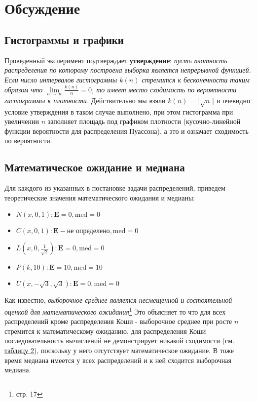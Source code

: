 \documentclass[12pt,a4paper]{article}
\begin{document}
\section{Обсуждение}
\subsection{Гистограммы и графики}
Проведенный эксперимент подтверждает \textbf{утверждение}: \textit{пусть плотность распределения по которому построена выборка является непрерывной функцией. Если число интервалов гистограммы $k(n)$ стремится к бесконечности таким образом что $\lim\limits_{n\to\infty}{\frac{k(n)}{n}}=0$, то имеет место сходимость по вероятности гистограммы к плотности.}\cite{chernova} Действительно мы взяли $k(n)=\lceil\sqrt{n}\rceil$ и очевидно условие утверждения в таком случае выполнено, при этом гистограмма при увеличении $n$ заполняет площадь под графиком плотности (кусочно-линейной функции вероятности для распределения Пуассона), а это и означает сходимость по вероятности.

\subsection{Математическое ожидание и медиана}
Для каждого из указанных в постановке задачи распределений, приведем теоретические значения математического ожидания и медианы:

\begin{itemize}
	\item $N(x, 0, 1): \mathbf{E}=0, \text{med}=0$ 
	\item $C(x, 0, 1): \mathbf{E} - \text{не определено}, \text{med}=0$
	\item $L(x, 0, \frac{1}{\sqrt{2}}): \mathbf{E}=0, \text{med}=0$
	\item $P(k, 10): \mathbf{E}=10, \text{med}=10$
	\item $U(x, -\sqrt{3}, \sqrt{3}): \mathbf{E}=0, \text{med}=0$
\end{itemize}

Как известно, \textit{выборочное среднее является несмещенной и состоятельной оценкой для математического ожидания}\footnote{\cite{chernova} стр. 17} Это объясняет то что для всех распределений кроме распределения Коши - выборочное среднее при росте $n$ стремится к математическому ожиданию, для распределения Коши последовательность вычислений не демонстрирует никакой сходимости (см. \hyperref[tab:cauchy]{таблицу 2}), поскольку у него отсутствует математическое ожидание. В тоже время медиана имеется у всех распределений и к ней сходится выборочная медиана.
\end{document}
